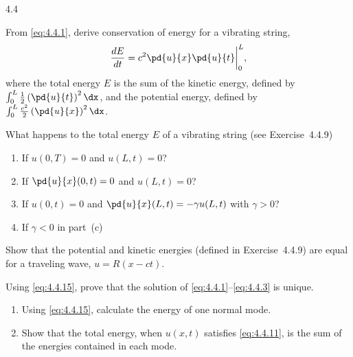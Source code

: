 \begin{exercises}{4.4}
\item From \eqref{eq:4.4.1}, derive conservation of energy for a vibrating string,
\begin{equation}
\frac{dE}{dt} = c^2\pd{u}{x}\pd{u}{t}\bigg|_0^L,
\label{eq:4.4.15}
\end{equation}
where the total energy $E$ is the sum of the kinetic energy, defined by $\int_0^L \frac{1}{2}\left(\pd{u}{t}\right)^2\dx$, and the potential energy, defined by $\int_0^L \frac{c^2}{2}\left(\pd{u}{x}\right)^2\dx$.

\item What happens to the total energy $E$ of a vibrating string (see Exercise~4.4.9)
\begin{enumerate}
\item[(a)] If $u(0,T) = 0$ and $u(L,t) = 0$?
\item[(b)] If $\pd{u}{x}(0,t) = 0$ and $u(L,t) = 0$?
\item[(c)] If $u(0,t) = 0$ and $\pd{u}{x}(L,t) = -\gamma u(L,t)$ with $\gamma > 0$?
\item[(d)] If $\gamma < 0$ in part~(c)
\end{enumerate}

\item Show that the potential and kinetic energies (defined in Exercise~4.4.9) are equal for a traveling wave, $u = R(x - ct)$.

\item Using \eqref{eq:4.4.15}, prove that the solution of \eqref{eq:4.4.1}--\eqref{eq:4.4.3} is unique.

\item
\begin{enumerate}
\item[(a)] Using \eqref{eq:4.4.15}, calculate the energy of one normal mode.
\item[(b)] Show that the total energy, when $u(x,t)$ satisfies \eqref{eq:4.4.11}, is the sum of the energies contained in each mode.
\end{enumerate}

\end{exercises}
